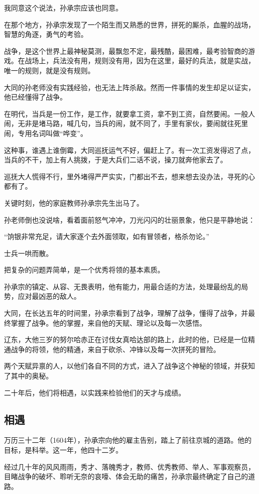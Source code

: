 \begin{multicols}{\theparacolNo}
我同意这个说法，孙承宗应该也同意。

在那个地方，孙承宗发现了一个陌生而又熟悉的世界，拼死的厮杀，血腥的战场，智慧的角逐，勇气的考验。

战争，是这个世界上最神秘莫测，最飘忽不定，最残酷，最困难，最考验智商的游戏。在战场上，兵法没有用，规则没有用，因为在这里，最好的兵法，就是实战，唯一的规则，就是没有规则。

大同的孙老师没有实践经验，也无法上阵杀敌。然而一件事情的发生却足以证实，他已经懂得了战争。

在明代，当兵是一份工作，是工作，就要拿工资，拿不到工资，自然要闹。一般人闹，无非是堵马路，喊几句，当兵的闹，就不同了，手里有家伙，要闹就往死里闹，专用名词叫做“哗变”。

这种事，谁遇上谁倒霉，大同巡抚运气不好，偏赶上了。有一次工资发得迟了点，当兵的不干，加上有人挑拨，于是大兵们二话不说，操刀就奔他家去了。

巡抚大人慌得不行，里外堵得严严实实，门都出不去，想来想去没办法，寻死的心都有了。

关键时刻，他的家庭教师孙承宗先生出马了。

孙老师倒也没说啥，看着面前怒气冲冲，刀光闪闪的壮丽景象，他只是平静地说：

“饷银非常充足，请大家逐个去外面领取，如有冒领者，格杀勿论。”

士兵一哄而散。

把复杂的问题弄简单，是一个优秀将领的基本素质。

孙承宗的镇定、从容、无畏表明，他有能力，用最合适的方法，处理最纷乱的局势，应对最凶恶的敌人。

大同，在长达五年的时间里，孙承宗看到了战争，理解了战争，懂得了战争，并最终掌握了战争。他的掌握，来自他的天赋、理论以及每一次感悟。

辽东，大他三岁的努尔哈赤正在讨伐女真哈达部的路上，此时的他，已经是一位精通战争的将领，他的精通，来自于砍杀、冲锋以及每一次拼死的冒险。

两个天赋异禀的人，以他们各自不同的方式，进入了战争这个神秘的领域，并获知了其中的奥秘。

二十年后，他们将相遇，以实践来检验他们的天才与成绩。

\subsection{相遇}
万历三十二年（1604年），孙承宗向他的雇主告别，踏上了前往京城的道路。他的目标，是科举。这一年，他四十二岁。

经过几十年的风风雨雨，秀才、落魄秀才，教师、优秀教师、举人、军事观察员，目睹战争的破坏、聆听无奈的哀嚎、体会无助的痛苦，孙承宗最终确定了自己的道路。


\end{multicols}
